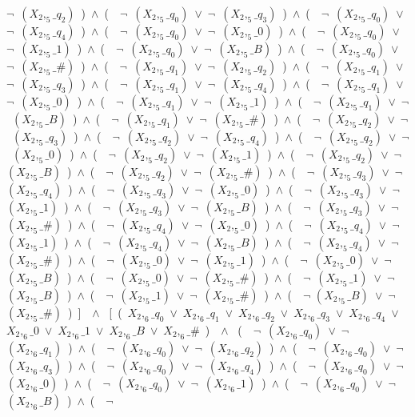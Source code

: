 ﻿\documentclass[a4paper,10pt]{article}
\begin{document}
$\neg$\ $(X_2,_5\_q_2)$\ )\ $\wedge$\ (\ \ $\neg$\ $(X_2,_5\_q_0)$\ $\vee$\ $\neg$\ $(X_2,_5\_q_3)$\ )\ $\wedge$\ (\ \ $\neg$\ $(X_2,_5\_q_0)$\ $\vee$\ $\neg$\ $(X_2,_5\_q_4)$\ )\ $\wedge$\ (\ \ $\neg$\ $(X_2,_5\_q_0)$\ $\vee$\ $\neg$\ $(X_2,_5\_0)$\ )\ $\wedge$\ (\ \ $\neg$\ $(X_2,_5\_q_0)$\ $\vee$\ $\neg$\ $(X_2,_5\_1)$\ )\ $\wedge$\ (\ \ $\neg$\ $(X_2,_5\_q_0)$\ $\vee$\ $\neg$\ $(X_2,_5\_B)$\ )\ $\wedge$\ (\ \ $\neg$\ $(X_2,_5\_q_0)$\ $\vee$\ $\neg$\ $(X_2,_5\_\#)$\ )\ $\wedge$\ (\ \ $\neg$\ $(X_2,_5\_q_1)$\ $\vee$\ $\neg$\ $(X_2,_5\_q_2)$\ )\ $\wedge$\ (\ \ $\neg$\ $(X_2,_5\_q_1)$\ $\vee$\ $\neg$\ $(X_2,_5\_q_3)$\ )\ $\wedge$\ (\ \ $\neg$\ $(X_2,_5\_q_1)$\ $\vee$\ $\neg$\ $(X_2,_5\_q_4)$\ )\ $\wedge$\ (\ \ $\neg$\ $(X_2,_5\_q_1)$\ $\vee$\ $\neg$\ $(X_2,_5\_0)$\ )\ $\wedge$\ (\ \ $\neg$\ $(X_2,_5\_q_1)$\ $\vee$\ $\neg$\ $(X_2,_5\_1)$\ )\ $\wedge$\ (\ \ $\neg$\ $(X_2,_5\_q_1)$\ $\vee$\ $\neg$\ $(X_2,_5\_B)$\ )\ $\wedge$\ (\ \ $\neg$\ $(X_2,_5\_q_1)$\ $\vee$\ $\neg$\ $(X_2,_5\_\#)$\ )\ $\wedge$\ (\ \ $\neg$\ $(X_2,_5\_q_2)$\ $\vee$\ $\neg$\ $(X_2,_5\_q_3)$\ )\ $\wedge$\ (\ \ $\neg$\ $(X_2,_5\_q_2)$\ $\vee$\ $\neg$\ $(X_2,_5\_q_4)$\ )\ $\wedge$\ (\ \ $\neg$\ $(X_2,_5\_q_2)$\ $\vee$\ $\neg$\ $(X_2,_5\_0)$\ )\ $\wedge$\ (\ \ $\neg$\ $(X_2,_5\_q_2)$\ $\vee$\ $\neg$\ $(X_2,_5\_1)$\ )\ $\wedge$\ (\ \ $\neg$\ $(X_2,_5\_q_2)$\ $\vee$\ $\neg$\ $(X_2,_5\_B)$\ )\ $\wedge$\ (\ \ $\neg$\ $(X_2,_5\_q_2)$\ $\vee$\ $\neg$\ $(X_2,_5\_\#)$\ )\ $\wedge$\ (\ \ $\neg$\ $(X_2,_5\_q_3)$\ $\vee$\ $\neg$\ $(X_2,_5\_q_4)$\ )\ $\wedge$\ (\ \ $\neg$\ $(X_2,_5\_q_3)$\ $\vee$\ $\neg$\ $(X_2,_5\_0)$\ )\ $\wedge$\ (\ \ $\neg$\ $(X_2,_5\_q_3)$\ $\vee$\ $\neg$\ $(X_2,_5\_1)$\ )\ $\wedge$\ (\ \ $\neg$\ $(X_2,_5\_q_3)$\ $\vee$\ $\neg$\ $(X_2,_5\_B)$\ )\ $\wedge$\ (\ \ $\neg$\ $(X_2,_5\_q_3)$\ $\vee$\ $\neg$\ $(X_2,_5\_\#)$\ )\ $\wedge$\ (\ \ $\neg$\ $(X_2,_5\_q_4)$\ $\vee$\ $\neg$\ $(X_2,_5\_0)$\ )\ $\wedge$\ (\ \ $\neg$\ $(X_2,_5\_q_4)$\ $\vee$\ $\neg$\ $(X_2,_5\_1)$\ )\ $\wedge$\ (\ \ $\neg$\ $(X_2,_5\_q_4)$\ $\vee$\ $\neg$\ $(X_2,_5\_B)$\ )\ $\wedge$\ (\ \ $\neg$\ $(X_2,_5\_q_4)$\ $\vee$\ $\neg$\ $(X_2,_5\_\#)$\ )\ $\wedge$\ (\ \ $\neg$\ $(X_2,_5\_0)$\ $\vee$\ $\neg$\ $(X_2,_5\_1)$\ )\ $\wedge$\ (\ \ $\neg$\ $(X_2,_5\_0)$\ $\vee$\ $\neg$\ $(X_2,_5\_B)$\ )\ $\wedge$\ (\ \ $\neg$\ $(X_2,_5\_0)$\ $\vee$\ $\neg$\ $(X_2,_5\_\#)$\ )\ $\wedge$\ (\ \ $\neg$\ $(X_2,_5\_1)$\ $\vee$\ $\neg$\ $(X_2,_5\_B)$\ )\ $\wedge$\ (\ \ $\neg$\ $(X_2,_5\_1)$\ $\vee$\ $\neg$\ $(X_2,_5\_\#)$\ )\ $\wedge$\ (\ \ $\neg$ $(X_2,_5\_B)$\ $\vee$\ $\neg$ $(X_2,_5\_\#)$\ )\ ]\ \ $\wedge$ \ [\ (\ $X_2,_6\_q_0$\ $\vee$\ $X_2,_6\_q_1$\ $\vee$\ $X_2,_6\_q_2$\ $\vee$\ $X_2,_6\_q_3$\ $\vee$\ $X_2,_6\_q_4$\ $\vee$\ $X_2,_6\_0$\ $\vee$\ $X_2,_6\_1$\ $\vee$\ $X_2,_6\_B$\ $\vee$\ $X_2,_6\_\#$\ )\ \ $\wedge$ \ (\ \ $\neg$\ $(X_2,_6\_q_0)$\ $\vee$\ $\neg$\ $(X_2,_6\_q_1)$\ )\ $\wedge$\ (\ \ $\neg$\ $(X_2,_6\_q_0)$\ $\vee$\ $\neg$\ $(X_2,_6\_q_2)$\ )\ $\wedge$\ (\ \ $\neg$\ $(X_2,_6\_q_0)$\ $\vee$\ $\neg$\ $(X_2,_6\_q_3)$\ )\ $\wedge$\ (\ \ $\neg$\ $(X_2,_6\_q_0)$\ $\vee$\ $\neg$\ $(X_2,_6\_q_4)$\ )\ $\wedge$\ (\ \ $\neg$\ $(X_2,_6\_q_0)$\ $\vee$\ $\neg$\ $(X_2,_6\_0)$\ )\ $\wedge$\ (\ \ $\neg$\ $(X_2,_6\_q_0)$\ $\vee$\ $\neg$\ $(X_2,_6\_1)$\ )\ $\wedge$\ (\ \ $\neg$\ $(X_2,_6\_q_0)$\ $\vee$\ $\neg$\ $(X_2,_6\_B)$\ )\ $\wedge$\ (\ \ $\neg$\ 
\end{document}
